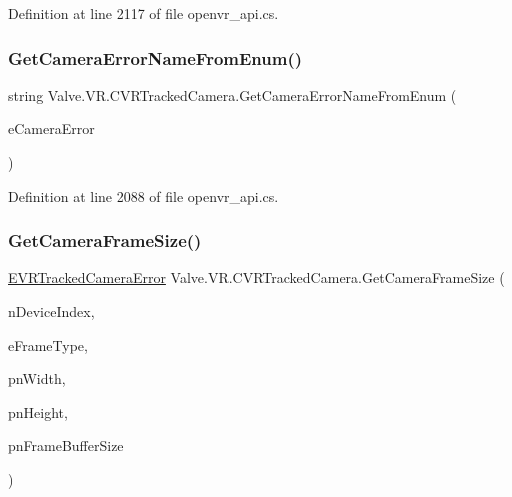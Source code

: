 Definition at line 2117 of file openvr\+\_\+api.\+cs.

\mbox{\label{class_valve_1_1_v_r_1_1_c_v_r_tracked_camera_aa39eb940b32bf3603c048bf01b720015}} 
\subsubsection{\texorpdfstring{GetCameraErrorNameFromEnum()}{GetCameraErrorNameFromEnum()}}
{\footnotesize\ttfamily string Valve.\+V\+R.\+C\+V\+R\+Tracked\+Camera.\+Get\+Camera\+Error\+Name\+From\+Enum (\begin{DoxyParamCaption}\item[{\mbox{\hyperlink{namespace_valve_1_1_v_r_ad0e012e846f5d93848783c044614cfd3}{E\+V\+R\+Tracked\+Camera\+Error}}}]{e\+Camera\+Error }\end{DoxyParamCaption})}



Definition at line 2088 of file openvr\+\_\+api.\+cs.

\mbox{\label{class_valve_1_1_v_r_1_1_c_v_r_tracked_camera_a6f5b1378d36c914562cb4edd80a8df65}} 
\subsubsection{\texorpdfstring{GetCameraFrameSize()}{GetCameraFrameSize()}}
{\footnotesize\ttfamily \mbox{\hyperlink{namespace_valve_1_1_v_r_ad0e012e846f5d93848783c044614cfd3}{E\+V\+R\+Tracked\+Camera\+Error}} Valve.\+V\+R.\+C\+V\+R\+Tracked\+Camera.\+Get\+Camera\+Frame\+Size (\begin{DoxyParamCaption}\item[{uint}]{n\+Device\+Index,  }\item[{\mbox{\hyperlink{namespace_valve_1_1_v_r_a9962211bc3fe98c2683db188c12c9afd}{E\+V\+R\+Tracked\+Camera\+Frame\+Type}}}]{e\+Frame\+Type,  }\item[{ref uint}]{pn\+Width,  }\item[{ref uint}]{pn\+Height,  }\item[{ref uint}]{pn\+Frame\+Buffer\+Size }\end{DoxyParamCaption})}



